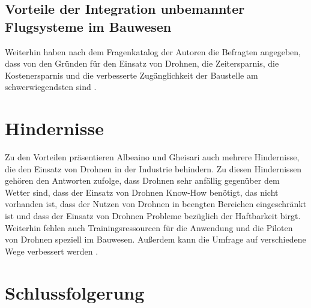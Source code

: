 \subsection{Vorteile der Integration unbemannter Flugsysteme im Bauwesen}

Weiterhin haben nach dem Fragenkatalog der Autoren die Befragten angegeben, dass von den Gründen für den Einsatz von Drohnen, die Zeitersparnis, die Kostenersparnis und die verbesserte Zugänglichkeit der Baustelle am schwerwiegendsten sind \cite[S. 98--99]{abaeano2021trends}.

\section{Hindernisse}


Zu den Vorteilen präsentieren Albeaino und Gheisari auch mehrere Hindernisse, die den Einsatz von Drohnen in der Industrie behindern.
Zu diesen Hindernissen gehören den Antworten zufolge, dass Drohnen sehr anfällig gegenüber dem Wetter sind, dass der Einsatz von Drohnen Know-How benötigt, das nicht vorhanden ist, dass der Nutzen von Drohnen in beengten Bereichen eingeschränkt ist und dass der Einsatz von Drohnen Probleme bezüglich der Haftbarkeit birgt.
Weiterhin fehlen auch Trainingsressourcen für die Anwendung und die Piloten von Drohnen speziell im Bauwesen.
Außerdem kann die Umfrage auf verschiedene Wege verbessert werden \cite[S. 99--104]{abaeano2021trends}.

\section{Schlussfolgerung}

